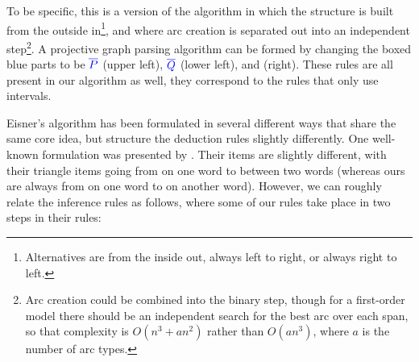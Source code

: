 To be specific, this is a version of the algorithm in which the structure is built from the outside in\footnote{
Alternatives are from the inside out, always left to right, or always right to left.
}, and where arc creation is separated out into an independent step\footnote{
Arc creation could be combined into the binary step, though for a first-order model there should be an independent search for the best arc over each span, so that complexity is $O(n^3 + an^2)$ rather than $O(an^3)$, where $a$ is the number of arc types.
}.
A projective graph parsing algorithm can be formed by changing the boxed blue parts to be $\textcolor{blue}{\overline{P}}$ (upper left), $\textcolor{blue}{\overline{Q}}$ (lower left), and \scalebox{2.0}{$\textcolor{blue}{.}$} (right).
These rules are all present in our algorithm as well, they correspond to the rules that only use intervals.

Eisner's algorithm has been formulated in several different ways that share the same core idea, but structure the deduction rules slightly differently.
One well-known formulation was presented by \textcite{eisner-smith-2005}.
Their items are slightly different, with their triangle items going from on one word to between two words (whereas ours are always from on one word to on another word).
However, we can roughly relate the inference rules as follows, where some of our rules take place in two steps in their rules:

